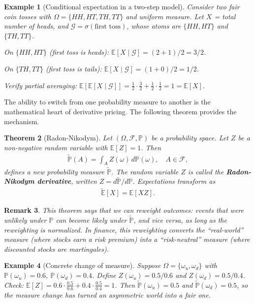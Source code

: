 \documentclass{report}
\theoremstyle{spacedplain}
\newtheorem{theorem}{Theorem}[section]
\theoremstyle{spaceddefinition}
\newtheorem{example}[theorem]{Example}
\theoremstyle{spacedremark}
\newtheorem{remark}[theorem]{Remark}
\begin{document}
\begin{example}[Conditional expectation in a two-step model]
Consider two fair coin tosses with $\Omega = \{HH, HT, TH, TT\}$ and uniform measure. Let $X$ = total number of heads, and $\mathcal{G} = \sigma(\text{first toss})$, whose atoms are $\{HH, HT\}$ and $\{TH, TT\}$.

On $\{HH, HT\}$ (first toss is heads): $\mathbb{E}[X \mid \mathcal{G}] = (2+1)/2 = 3/2$.

On $\{TH, TT\}$ (first toss is tails): $\mathbb{E}[X \mid \mathcal{G}] = (1+0)/2 = 1/2$.

Verify partial averaging: $\mathbb{E}[\mathbb{E}[X \mid \mathcal{G}]] = \frac{1}{2}\cdot\frac{3}{2} + \frac{1}{2}\cdot\frac{1}{2} = 1 = \mathbb{E}[X]$.
\end{example}

The ability to switch from one probability measure to another is the mathematical heart of derivative pricing. The following theorem provides the mechanism.

\begin{theorem}[Radon-Nikodym]
Let $(\Omega, \mathcal{F}, \mathbb{P})$ be a probability space. Let $Z$ be a non-negative random variable with $\mathbb{E}[Z] = 1$. Then
\begin{align}
    \widetilde{\mathbb{P}}(A) = \int_A Z(\omega)\, d\mathbb{P}(\omega), \quad A \in \mathcal{F},
\end{align}
defines a new probability measure $\widetilde{\mathbb{P}}$. The random variable $Z$ is called the \textbf{Radon-Nikodym derivative}, written $Z = d\widetilde{\mathbb{P}}/d\mathbb{P}$. Expectations transform as
\begin{align}
    \widetilde{\mathbb{E}}[X] = \mathbb{E}[XZ].
\end{align}
\end{theorem}

\begin{remark}
This theorem says that we can reweight outcomes: events that were unlikely under $\mathbb{P}$ can become likely under $\widetilde{\mathbb{P}}$, and vice versa, as long as the reweighting is normalized. In finance, this reweighting converts the ``real-world'' measure (where stocks earn a risk premium) into a ``risk-neutral'' measure (where discounted stocks are martingales).
\end{remark}

\begin{example}[Concrete change of measure]
Suppose $\Omega = \{\omega_u, \omega_d\}$ with $\mathbb{P}(\omega_u) = 0.6$, $\mathbb{P}(\omega_d) = 0.4$. Define $Z(\omega_u) = 0.5/0.6$ and $Z(\omega_d) = 0.5/0.4$. Check: $\mathbb{E}[Z] = 0.6 \cdot \frac{0.5}{0.6} + 0.4 \cdot \frac{0.5}{0.4} = 1$. Then $\widetilde{\mathbb{P}}(\omega_u) = 0.5$ and $\widetilde{\mathbb{P}}(\omega_d) = 0.5$, so the measure change has turned an asymmetric world into a fair one.
\end{example}
\end{document}
